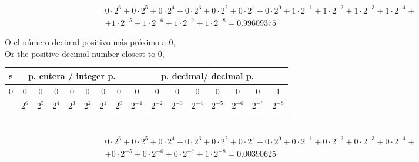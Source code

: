 \begin{equation*}
\begin{split}
&0\cdot 2^6+0 \cdot 2^5+ 0\cdot 2^4+ 0\cdot 2^3+ 0\cdot 2^2 + 0\cdot 2^1 + 0 \cdot 2^0 + 1 \cdot 2^{-1}+ 1 \cdot 2^{-2}+ 1 \cdot 2^{-3}+ 1 \cdot 2^{-4}+ \\
&+1 \cdot 2^{-5}+1 \cdot 2^{-6} +1 \cdot 2^{-7}+1 \cdot 2^{-8} =  0.99609375
\end{split}
\end{equation*}

\begin{paracol}{2}
O el número decimal positivo más próximo a 0,\\
\switchcolumn
Or the positive decimal number closest to 0,
\end{paracol}

\begin{tabular}{|c||c|c|c|c|c|c|c||c|c|c|c|c|c|c|c|}
\hline
s&\multicolumn{7}{c||}{p. entera / integer p.}&\multicolumn{8}{c|}{p. decimal/ decimal p.}\\
\hline
0&0&0&0&0&0&0&0&0&0&0&0&0&0&0&1\\
\hline
&$2^{6}$&$2^{5}$&$2^{4}$&$2^{3}$&$2^{2}$&$2^{1}$&$2^{0}$&$2^{-1}$&$2^{-2}$&$2^{-3}$&$2^{-4}$&$2^{-5}$&$2^{-6}$&$2^{-7}$&$2^{-8}$\\
\hline
\end{tabular}\\

\begin{equation*}
\begin{split}
&0\cdot 2^6+0 \cdot 2^5+ 0\cdot 2^4+ 0\cdot 2^3+ 0\cdot 2^2 + 0\cdot 2^1 + 0 \cdot 2^0 + 0 \cdot 2^{-1}+ 0 \cdot 2^{-2}+ 0 \cdot 2^{-3}+0 \cdot 2^{-4}+\\
&+ 0 \cdot 2^{-5}+0 \cdot 2^{-6} +0 \cdot 2^{-7}+1 \cdot 2^{-8} =  0.00390625
\end{split}
\end{equation*}


